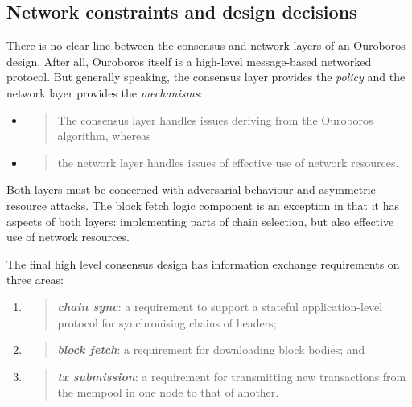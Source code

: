 \documentclass[11pt,a4paper]{article}
\begin{document}
\subsection{Network constraints and design decisions}
\label{network-constraints-and-design-decisions}

There is no clear line between the consensus and network layers of an
Ouroboros design. After all, Ouroboros itself is a high-level
message-based networked protocol. But generally speaking, the consensus
layer provides the \emph{policy} and the network layer provides the
\emph{mechanisms}:

\begin{itemize}
\item
  \begin{quote}
  The consensus layer handles issues deriving from the Ouroboros
  algorithm, whereas
  \end{quote}
\item
  \begin{quote}
  the network layer handles issues of effective use of network
  resources.
  \end{quote}
\end{itemize}

Both layers must be concerned with adversarial behaviour and asymmetric
resource attacks. The block fetch logic component is an exception in
that it has aspects of both layers: implementing parts of chain
selection, but also effective use of network resources.

The final high level consensus design has information exchange
requirements on three areas:

\begin{enumerate}
\def\labelenumi{\arabic{enumi}.}
\item
  \begin{quote}
  \emph{\textbf{chain sync}}: a requirement to support a stateful
  application-level protocol for synchronising chains of headers;
  \end{quote}
\item
  \begin{quote}
  \emph{\textbf{block fetch}}: a requirement for downloading block
  bodies; and
  \end{quote}
\item
  \begin{quote}
  \emph{\textbf{tx submission}}: a requirement for transmitting new
  transactions from the mempool in one node to that of another.
  \end{quote}
\end{enumerate}
\end{document}
